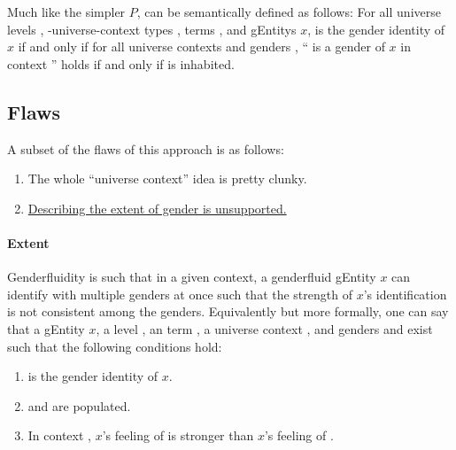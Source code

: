 \documentclass{article}
\theoremstyle{remark}
\begin{document}
Much like the simpler \(P\),  can be semantically defined as follows: For all universe levels , -universe-context types ,   terms , and \glspl{gEntity} \(x\),  is the gender identity of \(x\) if and only if for all universe contexts  and genders , `` is a gender of \(x\) in context '' holds if and only if    is inhabited.

\subsection{Flaws}\label{sec:gender4flaws}
A subset of the flaws of this approach is as follows:

\begin{enumerate}
  \item The whole ``universe context'' idea is pretty clunky.\label{enum:gender4flawsClunky}
  \item \hyperref[sec:gender4Extent]{Describing the extent of gender is unsupported.}\label{enum:gender4flawsExtent}
\end{enumerate}

\paragraph{Extent}\label{sec:gender4Extent}
Genderfluidity is such that in a given context, a genderfluid \gls{gEntity} \(x\) can identify with multiple genders at once such that the strength of \(x\)'s identification is not consistent among the genders.  Equivalently but more formally, one can say that a \gls{gEntity} \(x\), a level , an   term , a universe context , and genders  and  exist such that the following conditions hold:

\begin{enumerate}
  \item {} is the gender identity of \(x\).
  \item {}   and    are populated.
  \item In context , \(x\)'s feeling of  is stronger than \(x\)'s feeling of .
\end{enumerate}
\end{document}
